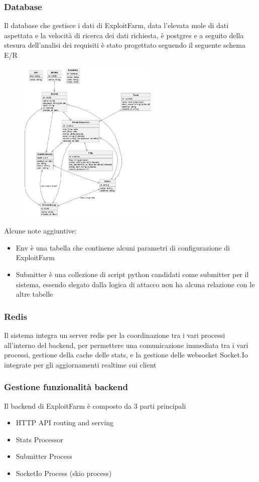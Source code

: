 \documentclass[11pt]{article}
\begin{document}
\subsubsection{Database}
Il database che gestisce i dati di ExploitFarm, data l'elevata mole di dati aspettata e la velocità di ricerca dei dati richiesta, è postgres e a seguito della stesura dell'analisi dei requisiti è stato progettato seguendo il seguente schema E/R
    \begin{figure}[H]
    	\centering
    	\includegraphics[width=0.6\textwidth]{ExploitFarmDB.png}
	\end{figure}
	Alcune note aggiuntive:
	\begin{itemize}
		\item Env è una tabella che continene alcuni parametri di configurazione di ExploitFarm
		\item Submitter è una collezione di script python candidati come submitter per il sistema, essendo slegato dalla logica di attacco non ha alcuna relazione con le altre tabelle
	\end{itemize}
\subsubsection{Redis}
Il sistema integra un server redis per la coordinazione tra i vari processi all'interno del backend, per permettere una comunicazione immediata tra i vari processi, gestione della cache delle stats, e la gestione delle websocket Socket.Io integrate per gli aggiornamenti realtime sui client
\subsubsection{Gestione funzionalità backend}
Il backend di ExploitFarm è composto da 3 parti principali
\begin{itemize}
	\item HTTP API routing and serving
	\item Stats Processor
	\item Submitter Process
	\item SocketIo Process (skio process)
\end{itemize}
\end{document}
